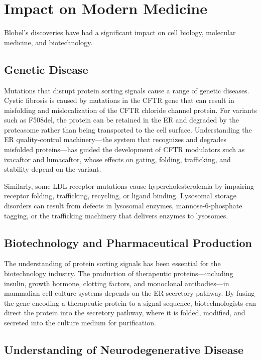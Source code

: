 \section{Impact on Modern Medicine}

Blobel's discoveries have had a significant impact on cell biology, molecular medicine, and biotechnology.

\subsection{Genetic Disease}

Mutations that disrupt protein sorting signals cause a range of genetic diseases. Cystic fibrosis is caused by mutations in the CFTR gene that can result in misfolding and mislocalization of the CFTR chloride channel protein. For variants such as F508del, the protein can be retained in the ER and degraded by the proteasome rather than being transported to the cell surface. Understanding the ER quality-control machinery---the system that recognizes and degrades misfolded proteins---has guided the development of CFTR modulators such as ivacaftor and lumacaftor, whose effects on gating, folding, trafficking, and stability depend on the variant.

Similarly, some LDL-receptor mutations cause hypercholesterolemia by impairing receptor folding, trafficking, recycling, or ligand binding. Lysosomal storage disorders can result from defects in lysosomal enzymes, mannose-6-phosphate tagging, or the trafficking machinery that delivers enzymes to lysosomes.

\subsection{Biotechnology and Pharmaceutical Production}

The understanding of protein sorting signals has been essential for the biotechnology industry. The production of therapeutic proteins---including insulin, growth hormone, clotting factors, and monoclonal antibodies---in mammalian cell culture systems depends on the ER secretory pathway. By fusing the gene encoding a therapeutic protein to a signal sequence, biotechnologists can direct the protein into the secretory pathway, where it is folded, modified, and secreted into the culture medium for purification.

\subsection{Understanding of Neurodegenerative Disease}

